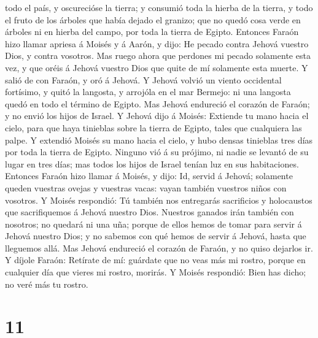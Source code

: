 todo el país, y oscurecióse la tierra; y consumió toda la hierba de la
tierra, y todo el fruto de los árboles que había dejado el granizo; que
no quedó cosa verde en árboles ni en hierba del campo, por toda la
tierra de Egipto.  Entonces Faraón hizo llamar apriesa á
Moisés y á Aarón, y dijo: He pecado contra Jehová vuestro Dios, y contra
vosotros.  Mas ruego ahora que perdones mi pecado
solamente esta vez, y que oréis á Jehová vuestro Dios que quite de mí
solamente esta muerte.  Y salió de con Faraón, y oró á
Jehová.  Y Jehová volvió un viento occidental fortísimo,
y quitó la langosta, y arrojóla en el mar Bermejo: ni una langosta quedó
en todo el término de Egipto.  Mas Jehová endureció el
corazón de Faraón; y no envió los hijos de Israel.  Y
Jehová dijo á Moisés: Extiende tu mano hacia el cielo, para que haya
tinieblas sobre la tierra de Egipto, tales que cualquiera las palpe.
 Y extendió Moisés su mano hacia el cielo, y hubo densas
tinieblas tres días por toda la tierra de Egipto. 
Ninguno vió á su prójimo, ni nadie se levantó de su lugar en tres días;
mas todos los hijos de Israel tenían luz en sus habitaciones.
 Entonces Faraón hizo llamar á Moisés, y dijo: Id, servid
á Jehová; solamente queden vuestras ovejas y vuestras vacas: vayan
también vuestros niños con vosotros.  Y Moisés respondió:
Tú también nos entregarás sacrificios y holocaustos que sacrifiquemos á
Jehová nuestro Dios.  Nuestros ganados irán también con
nosotros; no quedará ni una uña; porque de ellos hemos de tomar para
servir á Jehová nuestro Dios; y no sabemos con qué hemos de servir á
Jehová, hasta que lleguemos allá.  Mas Jehová endureció
el corazón de Faraón, y no quiso dejarlos ir.  Y díjole
Faraón: Retírate de mí: guárdate que no veas más mi rostro, porque en
cualquier día que vieres mi rostro, morirás.  Y Moisés
respondió: Bien has dicho; no veré más tu rostro.

\hypertarget{section-10}{%
\section{11}\label{section-10}}

